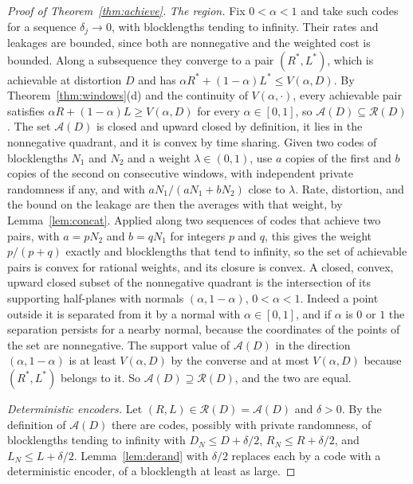 \documentclass[11pt,onecolumn]{IEEEtran}
\begin{document}
\begin{proof}[Proof of Theorem~\ref{thm:achieve}]
\emph{The region.} Fix $0<\alpha<1$ and take such codes for a sequence
$\delta_j\to0$, with blocklengths tending to infinity. Their rates and
leakages are bounded, since both are nonnegative and the weighted cost
is bounded. Along a subsequence they converge to a pair $(R^\ast,L^\ast)$,
which is achievable at distortion $D$ and has
$\alpha R^\ast+(1-\alpha)L^\ast\le V(\alpha,D)$. By
Theorem~\ref{thm:windows}(d) and the continuity of $V(\alpha,\cdot)$,
every achievable pair satisfies $\alpha R+(1-\alpha)L\ge V(\alpha,D)$ for
every $\alpha\in[0,1]$, so $\mathcal A(D)\subseteq\mathcal R(D)$. The set
$\mathcal A(D)$ is closed and upward closed by definition, it lies in the
nonnegative quadrant, and it is convex by time
sharing. Given two codes of blocklengths $N_1$ and $N_2$ and a weight
$\lambda\in(0,1)$, use $a$ copies of the first and $b$ copies of the
second on consecutive windows, with independent private randomness if
any, and with $aN_1/(aN_1+bN_2)$ close to $\lambda$. Rate, distortion,
and the bound on the leakage are then the averages with that weight,
by Lemma~\ref{lem:concat}. Applied along two sequences of codes that
achieve two pairs, with $a=pN_2$ and $b=qN_1$ for integers $p$ and $q$,
this gives the weight $p/(p+q)$ exactly and blocklengths that tend to
infinity, so the set of achievable pairs is convex for rational
weights, and its closure is convex. A closed, convex,
upward closed subset of the nonnegative quadrant is the intersection of
its supporting half-planes with normals $(\alpha,1-\alpha)$,
$0<\alpha<1$. Indeed a point outside it is separated from it by a
normal with $\alpha\in[0,1]$, and if $\alpha$ is $0$ or $1$ the
separation persists for a nearby normal, because the coordinates of the
points of the set are nonnegative. The support value of $\mathcal A(D)$
in the direction $(\alpha,1-\alpha)$ is at least $V(\alpha,D)$ by the
converse and at most $V(\alpha,D)$ because $(R^\ast,L^\ast)$ belongs to
it. So $\mathcal A(D)\supseteq\mathcal R(D)$, and the two are equal.

\emph{Deterministic encoders.} Let $(R,L)\in\mathcal R(D)=\mathcal A(D)$
and $\delta>0$. By the definition of $\mathcal A(D)$ there are codes,
possibly with private randomness, of blocklengths tending to infinity
with $D_N\le D+\delta/2$, $R_N\le R+\delta/2$, and $L_N\le L+\delta/2$.
Lemma~\ref{lem:derand} with $\delta/2$ replaces each by a code with a
deterministic encoder, of a blocklength at least as large.
\end{proof}
\end{document}
